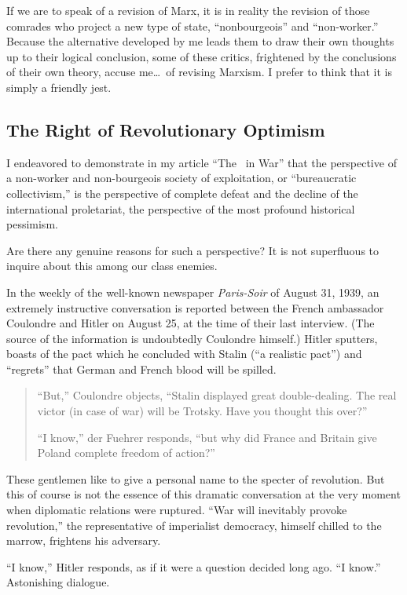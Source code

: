 If we are to speak of a revision of Marx, it is in reality the revision of those comrades who project a new type of state, “nonbourgeois” and “non-worker.” Because the alternative developed by me leads them to draw their own thoughts up to their logical conclusion, some of these critics, frightened by the conclusions of their own theory, accuse me\dots\ of revising Marxism. I prefer to think that it is simply a friendly jest.

\subsection*{The Right of Revolutionary Optimism}

I endeavored to demonstrate in my article ``The \USSR\ in War'' that the perspective of a non-worker and non-bourgeois society of exploitation, or “bureaucratic collectivism,” is the perspective of complete defeat and the decline of the international proletariat, the perspective of the most profound historical pessimism.

Are there any genuine reasons for such a perspective? It is not superfluous to inquire about this among our class enemies.

In the weekly of the well-known newspaper \emph{Paris-Soir} of August 31, 1939, an extremely instructive conversation is reported between the French ambassador Coulondre and Hitler on August 25, at the time of their last interview. (The source of the information is undoubtedly Coulondre himself.) Hitler sputters, boasts of the pact which he concluded with Stalin (“a realistic pact”) and “regrets” that German and French blood will be spilled.
\begin{quote}
  “But,” Coulondre objects, “Stalin displayed great double-dealing. The real victor (in case of war) will be Trotsky. Have you thought this over?”
  
  “I know,” der Fuehrer responds, “but why did France and Britain give Poland complete freedom of action?”
\end{quote}
These gentlemen like to give a personal name to the specter of revolution. But this of course is not the essence of this dramatic conversation at the very moment when diplomatic relations were ruptured. “War will inevitably provoke revolution,” the representative of imperialist democracy, himself chilled to the marrow, frightens his adversary.

“I know,” Hitler responds, as if it were a question decided long ago. “I know.” Astonishing dialogue.


